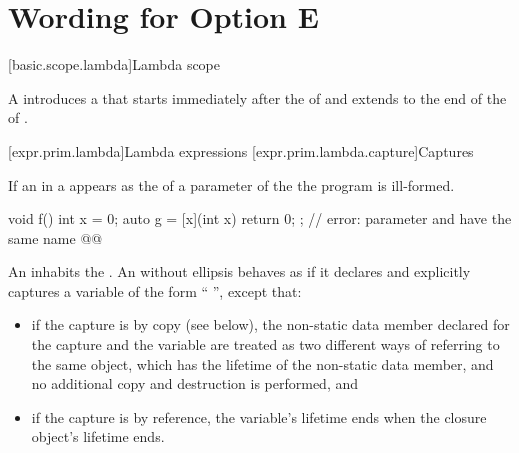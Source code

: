 \documentclass{wg21}
\begin{document}
\section{Wording for Option E}



\begin{addedblock}
[basic.scope.lambda]{Lambda scope}

A   introduces a  that starts immediately after the  of  and extends to the end of the  of
.
\end{addedblock}


[expr.prim.lambda]{Lambda expressions}
[expr.prim.lambda.capture]{Captures}



\pnum
If an  in a  appears
as the  of a parameter of the   the program is ill-formed.

\begin{example}
\begin{codeblock}
void f() {
    int x = 0;
    auto g = [x](int x) { return 0; };    // error: parameter and  have the same name
    @@
}
\end{codeblock}
\end{example}




\pnum
An  inhabits the .
An  without ellipsis
behaves as if it declares and explicitly captures a variable of
the form ``  \tcode{;}'', except that:
\begin{itemize}
    \item if the capture is by copy (see below), the non-static data member
    declared for the capture and the variable are treated as two different ways
    of referring to the same object, which has the lifetime of the non-static
    data member, and no additional copy and destruction is performed, and
    \item if the capture is by reference, the variable's lifetime ends when the
    closure object's lifetime ends.
\end{itemize}
\end{document}
